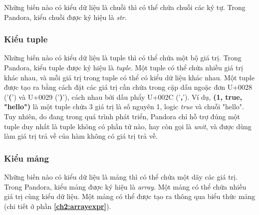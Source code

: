     Những biến nào có kiểu dữ liệu là chuỗi thì có thể chứa chuỗi các ký tự. Trong Pandora, kiểu chuỗi được ký hiệu là \textit{str}.

\subsubsection{Kiểu tuple}

    Những biến nào có kiểu dữ liệu là tuple thì có thể chứa một bộ giá trị. Trong Pandora, kiểu tuple được ký hiệu là \textit{tuple}. Một tuple có thể chứa nhiều giá trị khác nhau, và mỗi giá trị trong tuple có thể có kiểu dữ liệu khác nhau. Một tuple được tạo ra bằng cách đặt các giá trị cần chứa trong cặp dấu ngoặc đơn U+0028 ('\textbf{(}') và U+0029 ('\textbf{)}'), cách nhau bởi dấu phẩy U+002C ('\textbf{,}'). Ví dụ, \textbf{(1, true, "hello")} là một tuple chứa 3 giá trị là số nguyên 1, logic \textit{true} và chuỗi "hello". Tuy nhiên, do đang trong quá trình phát triển, Pandora chỉ hỗ trợ đúng một tuple duy nhất là tuple không có phần tử nào, hay còn gọi là \textit{unit}, và được dùng làm giá trị trả về của hàm không có giá trị trả về.

\subsubsection{Kiểu mảng}

    Những biến nào có kiểu dữ liệu là mảng thì có thể chứa một dãy các giá trị. Trong Pandora, kiểu mảng được ký hiệu là \textit{array}. Một mảng có thể chứa nhiều giá trị cùng kiểu dữ liệu. Một mảng có thể được tạo ra thông qua biểu thức mảng (chi tiết ở phần \textbf{\ref{ch2:arrayexpr}}).
